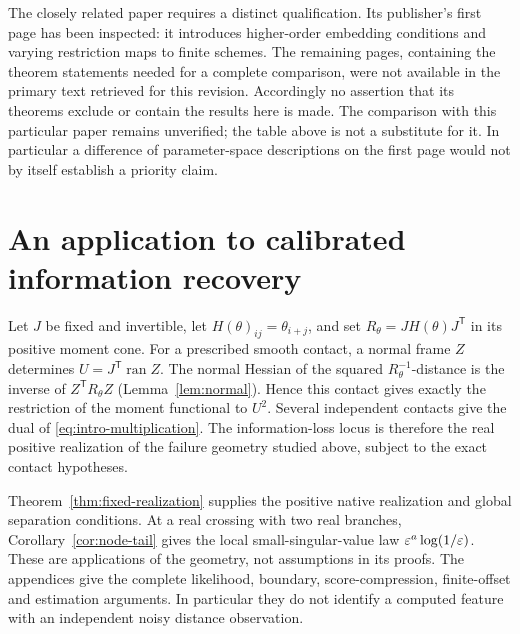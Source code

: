 The closely related paper \cite{Ballico93} requires a distinct
qualification. Its publisher's first page has been inspected: it
introduces higher-order embedding conditions and varying restriction
maps to finite schemes. The remaining pages, containing the theorem
statements needed for a complete comparison, were not available in
the primary text retrieved for this revision. Accordingly no assertion
that its theorems exclude or contain the results here is made. The
comparison with this particular paper remains unverified; the table
above is not a substitute for it. In particular a difference of
parameter-space descriptions on the first page would not by itself
establish a priority claim.

\section{An application to calibrated information recovery}
\label{sec:application-bridge}
Let $J$ be fixed and invertible, let $H(\theta)_{ij}=\theta_{i+j}$,
and set $R_\theta=JH(\theta)J^{\mathsf T}$ in its positive moment
cone. For a prescribed smooth contact, a normal frame $Z$ determines
$U=J^{\mathsf T}\operatorname{ran}Z$. The normal Hessian of the
squared $R_\theta^{-1}$-distance is the inverse of
$Z^{\mathsf T}R_\theta Z$ (Lemma~\ref{lem:normal}). Hence this
contact gives exactly the restriction of the moment functional to
$U^2$. Several independent contacts give the dual of
\eqref{eq:intro-multiplication}. The information-loss locus is
therefore the real positive realization of the failure geometry
studied above, subject to the exact contact hypotheses.

Theorem~\ref{thm:fixed-realization} supplies the positive native
realization and global separation conditions. At a real crossing
with two real branches, Corollary~\ref{cor:node-tail} gives the local
small-singular-value law $\varepsilon^a\log(1/\varepsilon)$. These are applications
of the geometry, not assumptions in its proofs. The appendices give
the complete likelihood, boundary, score-compression, finite-offset
and estimation arguments. In particular they do not identify a
computed feature with an independent noisy distance observation.
